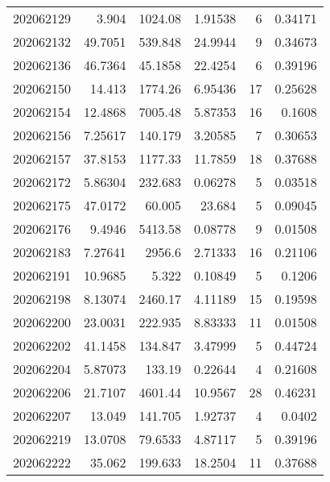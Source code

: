 \begin{tabular}{rrrrrr}
 202062129 &          3.904   &     1024.08   &            1.91538 &           6 & 0.34171 \\
 202062132 &         49.7051  &      539.848  &           24.9944  &           9 & 0.34673 \\
 202062136 &         46.7364  &       45.1858 &           22.4254  &           6 & 0.39196 \\
 202062150 &         14.413   &     1774.26   &            6.95436 &          17 & 0.25628 \\
 202062154 &         12.4868  &     7005.48   &            5.87353 &          16 & 0.1608  \\
 202062156 &          7.25617 &      140.179  &            3.20585 &           7 & 0.30653 \\
 202062157 &         37.8153  &     1177.33   &           11.7859  &          18 & 0.37688 \\
 202062172 &          5.86304 &      232.683  &            0.06278 &           5 & 0.03518 \\
 202062175 &         47.0172  &       60.005  &           23.684   &           5 & 0.09045 \\
 202062176 &          9.4946  &     5413.58   &            0.08778 &           9 & 0.01508 \\
 202062183 &          7.27641 &     2956.6    &            2.71333 &          16 & 0.21106 \\
 202062191 &         10.9685  &        5.322  &            0.10849 &           5 & 0.1206  \\
 202062198 &          8.13074 &     2460.17   &            4.11189 &          15 & 0.19598 \\
 202062200 &         23.0031  &      222.935  &            8.83333 &          11 & 0.01508 \\
 202062202 &         41.1458  &      134.847  &            3.47999 &           5 & 0.44724 \\
 202062204 &          5.87073 &      133.19   &            0.22644 &           4 & 0.21608 \\
 202062206 &         21.7107  &     4601.44   &           10.9567  &          28 & 0.46231 \\
 202062207 &         13.049   &      141.705  &            1.92737 &           4 & 0.0402  \\
 202062219 &         13.0708  &       79.6533 &            4.87117 &           5 & 0.39196 \\
 202062222 &         35.062   &      199.633  &           18.2504  &          11 & 0.37688 \\

\end{tabular}
